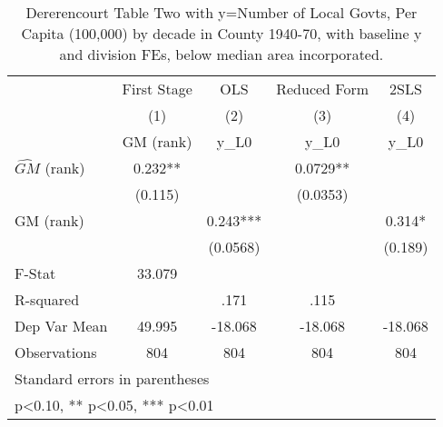 \begin{table}[htbp]\centering
\def\sym#1{\ifmmode^{#1}\else\(^{#1}\)\fi}
\caption{Dererencourt Table Two with y=Number of Local Govts, Per Capita (100,000) by decade in County 1940-70, with baseline y and division FEs, below median area incorporated.}
\begin{tabular}{l*{4}{c}}
\toprule
                    & First Stage   &         OLS   &Reduced Form   &        2SLS   \\
                    &\multicolumn{1}{c}{(1)}&\multicolumn{1}{c}{(2)}&\multicolumn{1}{c}{(3)}&\multicolumn{1}{c}{(4)}\\
                    &\multicolumn{1}{c}{GM  (rank)}&\multicolumn{1}{c}{y\_L0}&\multicolumn{1}{c}{y\_L0}&\multicolumn{1}{c}{y\_L0}\\
\midrule
$\hat{GM}$ (rank)   &       0.232** &               &      0.0729** &               \\
                    &     (0.115)   &               &    (0.0353)   &               \\
\addlinespace
GM  (rank)          &               &       0.243***&               &       0.314*  \\
                    &               &    (0.0568)   &               &     (0.189)   \\
\midrule
F-Stat              &      33.079   &               &               &               \\
R-squared           &               &        .171   &        .115   &               \\
Dep Var Mean        &      49.995   &     -18.068   &     -18.068   &     -18.068   \\
Observations        &         804   &         804   &         804   &         804   \\
\bottomrule
\multicolumn{5}{l}{\footnotesize Standard errors in parentheses}\\
\multicolumn{5}{l}{\footnotesize * p<0.10, ** p<0.05, *** p<0.01}\\
\end{tabular}
\end{table}
